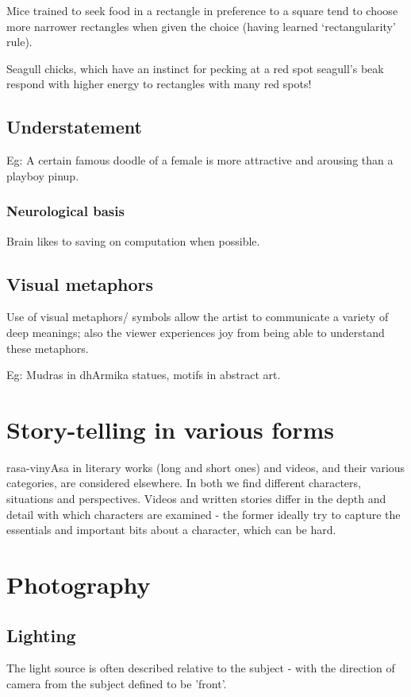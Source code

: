 \documentclass[oneside, article]{memoir}
\begin{document}
Mice trained to seek food in a rectangle in preference to a square tend to choose more narrower rectangles when given the choice (having learned `rectangularity' rule).

Seagull chicks, which have an instinct for pecking at a red spot seagull's beak respond with higher energy to rectangles with many red spots!

\section{Understatement}

Eg: A certain famous doodle of a female is more attractive and arousing than a playboy pinup.

\subsection{Neurological basis}
Brain likes to saving on computation when possible.

\section{Visual metaphors}
Use of visual metaphors/ symbols allow the artist to communicate a variety of deep meanings; also the viewer experiences joy from being able to understand these metaphors.

Eg: Mudras in dhArmika statues, motifs in abstract art.

\chapter{Story-telling in various forms}
rasa-vinyAsa in literary works (long and short ones) and videos, and their various categories, are considered elsewhere. In both we find different characters, situations and perspectives. Videos and written stories differ in the depth and detail with which characters are examined - the former ideally try to capture the essentials and important bits about a character, which can be hard.

\chapter{Photography}
\section{Lighting}
The light source is often described relative to the subject - with the direction of camera from the subject defined to be 'front'.
\end{document}
